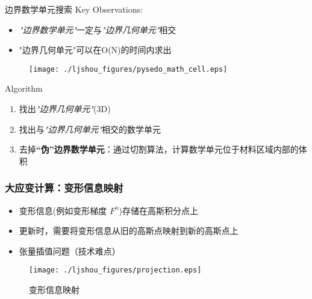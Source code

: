 \documentclass[mathserif]{beamer}
\begin{document}
\begin{CJK}{UTF8}{gkai}
        \begin{frame}{边界数学单元搜索}
            Key Observations:
            	\small
                \begin{itemize}
                \item \textit{"边界数学单元"}一定与\emph{"边界几何单元"}相交
                \item "边界几何单元"可以在O(N)的时间内求出
                \end{itemize}
        		\begin{figure}
				\centering
			   	\texttt{[image: ./ljshou\_figures/pysedo\_math\_cell.eps]}
			\end{figure}
			\begin{block}{Algorithm}
				\small
                \begin{enumerate}
                \item 找出\emph{"边界几何单元"}(3D)
                \item 找出与\emph{"边界几何单元"}相交的数学单元
                \item 去掉{\bf“伪”边界数学单元}：通过切割算法，计算数学单元位于材料区域内部的体积
                \end{enumerate}
            \end{block}
        \end{frame}
        
				
		\begin{frame}
			\frametitle{大应变计算：变形信息映射}
			\begin{itemize}
				\item 变形信息(例如变形梯度 $F^n$)存储在高斯积分点上
				\item 更新时，需要将变形信息从旧的高斯点映射到新的高斯点上
				\item 张量插值问题（技术难点）
			\end{itemize}
        	\begin{figure}
        		\centering
        		\texttt{[image: ./ljshou\_figures/projection.eps]}
        		\caption{变形信息映射}
        	\end{figure}
		\end{frame}	
		

\end{CJK}
\end{document}
